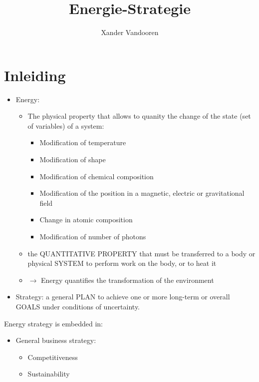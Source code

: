 \documentclass[12pt]{article}
\begin{document}
\begin{titlepage}
    \author{Xander Vandooren}
    \title{Energie-Strategie}
\end{titlepage}
\maketitle
\newpage
\tableofcontents
\newpage
{}
\section{Inleiding}
\begin{itemize}
    \item[] Energy:\begin{itemize}
        \item The physical property that allows to quanity the change of the state (set of variables) of a system:\begin{itemize}
            \item Modification of temperature
            \item Modification of shape 
            \item Modification of chemical composition 
            \item Modification of the position in a magnetic, electric or gravitational field 
            \item Change in atomic composition 
            \item Modification of number of photons
        \end{itemize}
    \item the QUANTITATIVE PROPERTY that must be transferred to a body or physical SYSTEM to
    perform work on the body, or to heat it
    \item $\rightarrow$ Energy quantifies the transformation of the environment
    \end{itemize}
    \item[] Strategy: a general PLAN to achieve one or more long-term or overall GOALS under
    conditions of uncertainty. 
\end{itemize}
Energy strategy is embedded in:\begin{itemize}
    \item General business strategy:\begin{itemize}
        \item Competitiveness 
        \item Sustainability
    \end{itemize}
\end{itemize}
\end{document}
